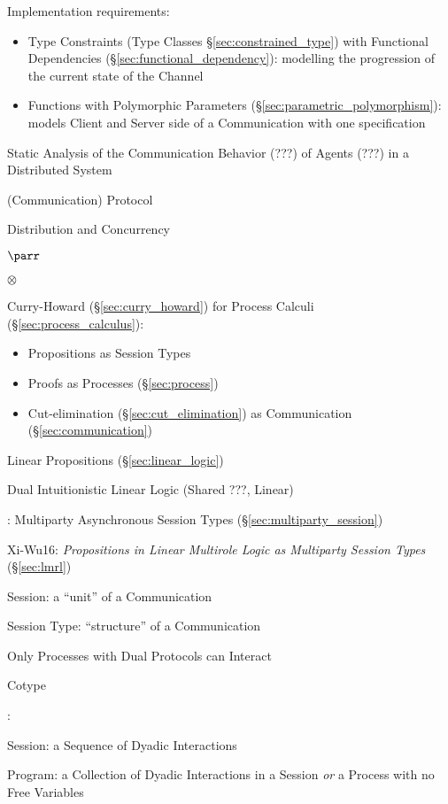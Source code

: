 Implementation requirements: \cite{neubauer-thiemann04}
\begin{itemize}
  \item Type Constraints (Type Classes \S\ref{sec:constrained_type})
    with Functional Dependencies (\S\ref{sec:functional_dependency}):
    modelling the progression of the current state of the Channel
  \item Functions with Polymorphic Parameters
    (\S\ref{sec:parametric_polymorphism}): models Client and Server
    side of a Communication with one specification
\end{itemize}

Static Analysis of the Communication Behavior (???) of Agents (???) in
a Distributed System \cite{gay-vasconcelos10}

(Communication) Protocol

Distribution and Concurrency

$\parr$

$\otimes$

Curry-Howard (\S\ref{sec:curry_howard}) for Process Calculi
(\S\ref{sec:process_calculus}):
\begin{itemize}
  \item Propositions as Session Types
  \item Proofs as Processes (\S\ref{sec:process})
  \item Cut-elimination (\S\ref{sec:cut_elimination}) as Communication
    (\S\ref{sec:communication})
\end{itemize}

Linear Propositions (\S\ref{sec:linear_logic})

Dual Intuitionistic Linear Logic \cite{caires-pfenning10} (Shared ???,
Linear)

\cite{honda-yoshida-carbone08}: Multiparty Asynchronous Session Types
(\S\ref{sec:multiparty_session})

Xi-Wu16: \emph{Propositions in Linear Multirole Logic as
  Multiparty Session Types} (\S\ref{sec:lmrl})

Session: a ``unit'' of a Communication

Session Type: ``structure'' of a Communication

Only Processes with Dual Protocols can Interact

Cotype


\cite{honda-vasconcelos-kubo98}:

Session: a Sequence of Dyadic Interactions

Program: a Collection of Dyadic Interactions in a Session \emph{or} a
Process with no Free Variables %

